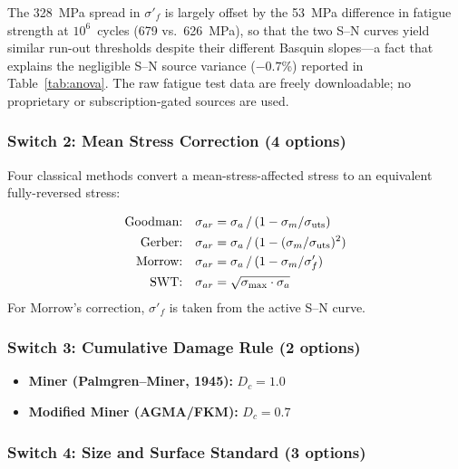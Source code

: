 \documentclass[12pt,a4paper]{article}
\begin{document}
The 328~MPa spread in $\sigma'_f$ is largely offset by the 53~MPa
difference in fatigue strength at $10^6$~cycles (679 vs.\ 626~MPa),
so that the two S--N curves yield similar run-out thresholds despite
their different Basquin slopes---a fact that explains the negligible
S--N source variance ($-0.7$\%) reported in Table~\ref{tab:anova}.
The raw fatigue test data are freely downloadable; no proprietary or
subscription-gated sources are used.

\subsubsection{Switch 2: Mean Stress Correction (4 options)}

Four classical methods convert a mean-stress-affected stress to an
equivalent fully-reversed stress:

\begin{subequations}\label{eq:mean_stress}
\begin{align}
\text{Goodman:}\quad
  \sigma_{ar} &= \sigma_a \,/\, (1 - \sigma_m/\sigma_{\rm uts})
  \label{eq:goodman} \\
\text{Gerber:}\quad
  \sigma_{ar} &= \sigma_a \,/\, (1 - (\sigma_m/\sigma_{\rm uts})^2)
  \label{eq:gerber} \\
\text{Morrow:}\quad
  \sigma_{ar} &= \sigma_a \,/\, (1 - \sigma_m/\sigma'_f)
  \label{eq:morrow} \\
\text{SWT:}\quad
  \sigma_{ar} &= \sqrt{\sigma_{\max} \cdot \sigma_a}
  \label{eq:swt}
\end{align}
\end{subequations}
For Morrow's correction, $\sigma'_f$ is taken from the active S--N
curve.

\subsubsection{Switch 3: Cumulative Damage Rule (2 options)}

\begin{itemize}
  \item \textbf{Miner (Palmgren--Miner, 1945):} $D_c = 1.0$
  \item \textbf{Modified Miner (AGMA/FKM):} $D_c = 0.7$
\end{itemize}

\subsubsection{Switch 4: Size and Surface Standard (3 options)}
\end{document}
